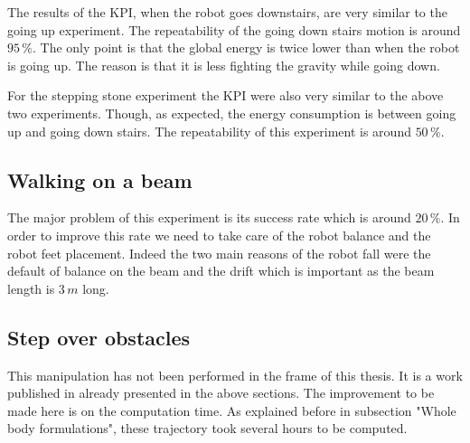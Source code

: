 The results of the KPI, when the robot goes downstairs, are very similar to the going up experiment.
The repeatability of the going down stairs motion is around $95\,\%$.
The only point is that the global energy is twice lower than when the robot is going up.
The reason is that it is less fighting the gravity while going down.

For the stepping stone experiment the KPI were also very similar to the above two experiments.
Though, as expected, the energy consumption is between going up and going down stairs.
The repeatability of this experiment is around $50\,\%$.

\subsection*{Walking on a beam}

The major problem of this experiment is its success rate which is around $20\,\%$.
In order to improve this rate we need to take care of the robot balance and the robot feet placement.
Indeed the two main reasons of the robot fall were the default of balance on the beam and the drift which is important as the beam length is $3\,m$ long.

\subsection*{Step over obstacles}

This manipulation has not been performed in the frame of this thesis.
It is a work published in \cite{koch:ichr:2014} already presented in the above sections.
The improvement to be made here is on the computation time.
As explained before in subsection {"Whole body formulations"}, these trajectory took several hours to be computed.
